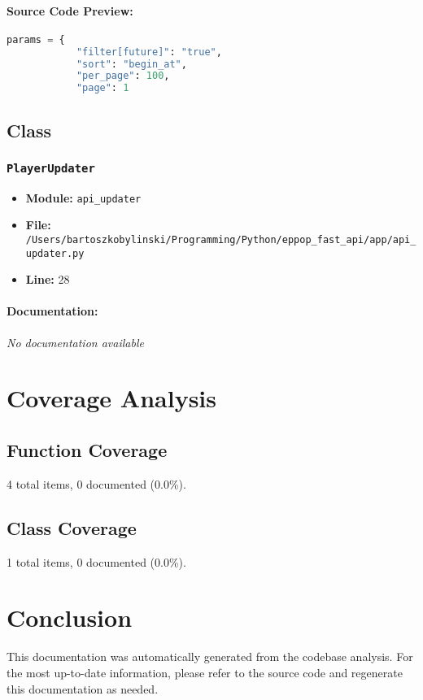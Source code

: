 \documentclass[11pt,a4paper]{article}
\begin{document}
\paragraph{Source Code Preview:}
\begin{lstlisting}[language=Python]
        params = {
            "filter[future]": "true",
            "sort": "begin_at",
            "per_page": 100,
            "page": 1
\end{lstlisting}

\vspace{1em}
\subsection{Class}

\subsubsection{\texttt{PlayerUpdater}}

\begin{itemize}
    \item \textbf{Module:} \texttt{api\_updater}
    \item \textbf{File:} \texttt{/Users/bartoszkobylinski/Programming/Python/eppop\_fast\_api/app/api\_updater.py}
    \item \textbf{Line:} 28
\end{itemize}

\paragraph{Documentation:} \textit{No documentation available}


\vspace{1em}


\section{Coverage Analysis}

\subsection{Function Coverage}

4 total items, 0 documented (0.0\%).

\subsection{Class Coverage}

1 total items, 0 documented (0.0\%).


\section{Conclusion}

This documentation was automatically generated from the codebase analysis. For the most up-to-date information, please refer to the source code and regenerate this documentation as needed.
\end{document}
